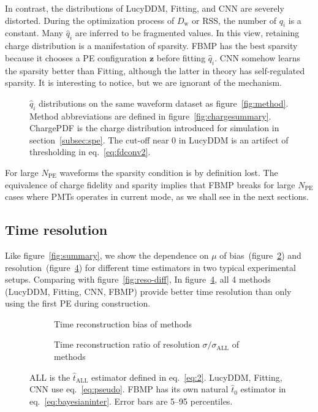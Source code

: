 In contrast, the distributions of LucyDDM, Fitting, and CNN are severely distorted.  During the optimization process of $D_\mathrm{w}$ or RSS, the number of $q_i$ is a constant. Many $\hat{q}_i$ are inferred to be fragmented values.  In this view, retaining charge distribution is a manifestation of sparsity.  FBMP has the best sparsity because it chooses a PE configuration $\bm{z}$ before fitting $\hat{q}_i$.  CNN somehow learns the sparsity better than Fitting, although the latter in theory has self-regulated sparsity.  It is interesting to notice, but we are ignorant of the mechanism.

\begin{figure}[H]
  \centering
  \resizebox{0.6\textwidth}{!}{}
  \caption{\label{fig:recchargehist} $\hat{q}_i$ distributions on the same waveform dataset as figure~\ref{fig:method}.  Method abbreviations are defined in figure~\ref{fig:chargesummary}. ChargePDF is the charge distribution introduced for simulation in section~\ref{subsec:spe}. The cut-off near 0 in LucyDDM is an artifect of thresholding in eq.~\eqref{eq:fdconv2}.}
\end{figure}

For large $N_\mathrm{PE}$ waveforms the sparsity condition is by definition lost.  The equivalence of charge fidelity and sparity implies that FBMP breaks for large $N_\mathrm{PE}$ cases where PMTs operates in current mode, as we shall see in the next sections.

\subsection{Time resolution}
\label{subsec:timeresolution}

Like figure~\ref{fig:summary}, we show the dependence on $\mu$ of bias~(figure~\ref{fig:biasmethods}) and resolution~(figure~\ref{fig:deltamethods}) for different time estimators in two typical experimental setups.  Comparing with figure~\ref{fig:reso-diff}, In figure~\ref{fig:deltamethods}, all 4 methods (LucyDDM, Fitting, CNN, FBMP) provide better time resolution than only using the first PE during construction.

\begin{figure}[H]
  \begin{subfigure}[b]{\textwidth}
    \centering
    \resizebox{\textwidth}{!}{}
    \caption{\label{fig:biasmethods} Time reconstruction bias of methods}
  \end{subfigure}
  \begin{subfigure}[b]{\textwidth}
    \centering
    \resizebox{\textwidth}{!}{}
    \caption{\label{fig:deltamethods} Time reconstruction ratio of resolution $\sigma/\sigma_{\mathrm{ALL}}$ of methods}
  \end{subfigure}
  \caption{ALL is the $\hat{t}_\mathrm{ALL}$ estimator defined in eq.~\eqref{eq:2}. LucyDDM, Fitting, CNN use eq.~\eqref{eq:pseudo}.  FBMP has its own natural $\hat{t}_0$ estimator in eq.~\eqref{eq:bayesianinter}. Error bars are 5--95 percentiles.}
\end{figure}

